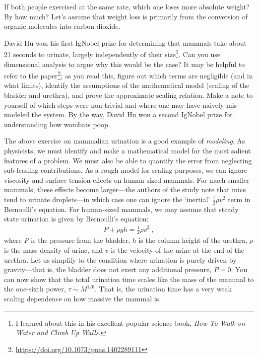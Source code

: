 \begin{exercise}
If both people exercised at the same rate, which one loses more absolute weight? By how much? Let’s assume that weight loss is primarily from the conversion of organic molecules into carbon dioxide. 
\end{exercise}


\begin{exercise}
David Hu won his first IgNobel prize for determining that mammals take about 21 seconds to urinate, largely independently of their size\footnote{I learned about this in his excellent popular science book, \emph{How To Walk on Water and Climb Up Walls}.}. Can you use dimensional analysis to argue why this would be the case? It may be helpful to refer to the paper\footnote{\url{https://doi.org/10.1073/pnas.1402289111}}; as you read this, figure out which terms are negligible (and in what limits), identify the assumptions of the mathematical model (scaling of the bladder and urethra), and prove the approximate scaling relation. Make a note to yourself of which steps were non-trivial and where one may have naively mis-modeled the system. By the way, David Hu won a second IgNobel prize for understanding how wombats poop.
\end{exercise}

The above exercise on mammalian urination is a good example of \emph{modeling}. As physicists, we must identify and make a mathematical model for the most salient features of a problem. We must also be able to quantify the error from neglecting sub-leading contributions. As a rough model for scaling purposes, we can ignore viscosity and surface tension effects on human-sized mammals. For much smaller mammals, these effects become larger---the authors of the study note that mice tend to urinate droplets---in which case one can ignore the `inertial' $\frac{1}{2} \rho v^2$ term in Bernoulli's equation. For human-sized mammals, we may assume that steady state urination is given by Bernoulli's equation:
\begin{align}
  P + \rho g h = \frac{1}{2}\rho v^2 \ ,
\end{align}
where $P$ is the pressure from the bladder, $h$ is the column height of the urethra, $\rho$ is the mass density of urine, and $v$ is the velocity of the urine at the end of the urethra. Let us simplify to the condition where urination is purely driven by gravity---that is, the bladder does not exert any additional pressure, $P=0$. You can now show that the total urination time scales like the mass of the mammal to the one-sixth power, $\tau \sim M^{1/6}$. That is, the urination time has a very weak scaling dependence on how massive the mammal is.


